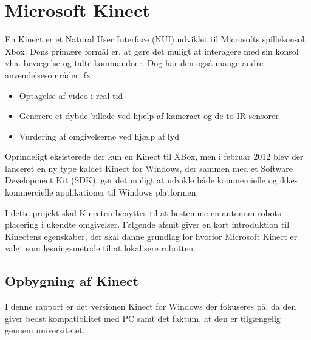  \section{Microsoft Kinect}\label{kinect}
En Kinect er et Natural User Interface (NUI) udviklet til Microsofts spillekonsol, Xbox.
Dens primære formål er, at gøre det muligt at interagere med sin konsol vha. bevægelse og talte kommandoer.
Dog har den også mange andre anvendelsesområder, fx:
%

\begin{itemize}
\item Optagelse af video i real-tid
\item Generere et dybde billede ved hjælp af kameraet og de to IR sensorer
\item Vurdering af omgivelserne ved hjælp af lyd
\end{itemize}

Oprindeligt eksisterede der kun en Kinect til XBox, men i februar 2012 blev der lanceret en ny type kaldet Kinect for Windows, der sammen med et Software Development Kit (SDK), gør det muligt at udvikle både kommercielle og ikke-kommercielle applikationer til Windows platformen.

I dette projekt skal Kinecten benyttes til at bestemme en autonom robots placering i ukendte omgivelser. 
Følgende afsnit giver en kort introduktion til Kinectens egenskaber, der skal danne grundlag for hvorfor Microsoft Kinect er valgt som løsningsmetode til at lokalisere robotten.\cite{kinectProgrammingGuide}

\subsection{Opbygning af Kinect}\label{kinect:komponenter}
I denne rapport er det versionen Kinect for Windows der fokuseres på, da den giver bedst kompatibilitet med PC samt det faktum, at den er tilgængelig gennem universitetet.

